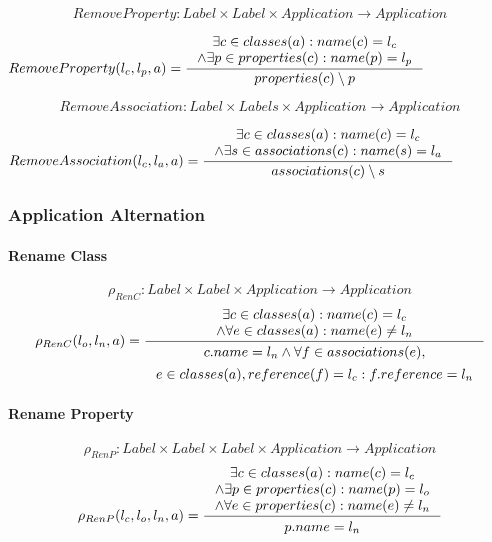 \documentclass[11pt]{article}
\begin{document}
$$RemoveProperty: Label \times Label \times Application \rightarrow Application $$

$
RemoveProperty(l_c, l_p, a) = \inference{\exists c \in classes(a) : name(c) = l_c \\ \wedge \exists p \in properties(c) : name(p) = l_p}{properties(c) \setminus p }
$

$$RemoveAssociation : Label \times Labels \times Application \rightarrow Application $$

$
RemoveAssociation(l_c, l_a, a) = \inference{\exists c \in classes(a) : name(c) = l_c \\ \wedge \exists s \in associations(c) : name(s) = l_a }{associations(c) \setminus s}
$

\subsubsection{Application Alternation}
\paragraph{Rename Class}
$$\rho_{RenC} : Label \times Label \times Application \rightarrow Application $$
\begin{equation*}
	\rho_{RenC}(l_o, l_n, a) = \inference{\exists c \in classes(a) : name(c) = l_c \\ \wedge \forall e \in classes(a) : name(e) \neq l_n}{\begin{gathered}
c.name = l_n \wedge \forall f \in associations(e), \\ e \in classes(a), reference(f) = l_c : f.reference = l_n 
\end{gathered}
}
\end{equation*}

\paragraph{Rename Property}
$$\rho_{RenP} : Label \times Label \times Label \times Application \rightarrow Application $$
\begin{equation*}
	\rho_{RenP}(l_c, l_o, l_n, a) = \inference{\exists c \in classes(a) : name(c) = l_c \\ \wedge \exists p \in properties(c) : name(p) = l_o \\ \wedge \forall e \in properties(c) : name(e) \neq l_n}{\begin{gathered}
p.name = l_n 
\end{gathered}
}
\end{equation*}
\end{document}
